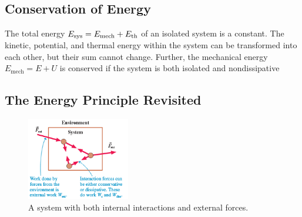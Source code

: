 \subsection{Conservation of Energy}

\begin{theorem}
    The total energy
    $
        E_{\mathrm{sys}} = E_\mathrm{mech} + E_\mathrm{th}
    $ of an isolated system is a constant.  The kinetic, potential, and
    thermal energy within the system can be transformed into each other,
    but their sum cannot change.  Further, the mechanical energy
    $
        E_\mathrm{mech} = E + U
    $ is conserved if the system is both isolated and nondissipative
\end{theorem}

\subsection{The Energy Principle Revisited}

\begin{figure}
    \centering
    \includegraphics[width=0.4\textwidth]{../figures/both-internal-external-model.png}
    \caption{A system with both internal interactions and external
    forces.}%
    \label{fig:internal-external-model}
\end{figure}
